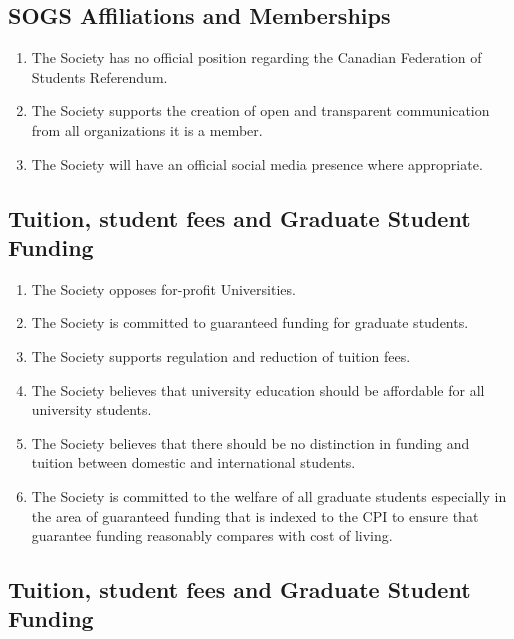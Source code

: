 \subsection{SOGS Affiliations and Memberships}
\begin{enumerate}
\item	The Society has no official position regarding the Canadian Federation of Students Referendum.
\item The Society supports the creation of open and transparent communication from all organizations it is a member.
\item The Society will have an official social media presence where appropriate.   
\end{enumerate}

\subsection{Tuition, student fees and Graduate Student Funding}
\begin{enumerate}
\item 	The Society opposes for-profit Universities. 
\item The Society is committed to guaranteed funding for graduate students.
\item 	The Society supports regulation and reduction of tuition fees.
\item The Society believes that university education should be affordable for all university students.
\item The Society believes that there should be no distinction in funding and tuition between domestic and international students.
\item The Society is committed to the welfare of all graduate students especially in the area of guaranteed funding that is indexed to the CPI to ensure that guarantee funding reasonably compares with cost of living.

\end{enumerate}


\subsection{Tuition, student fees and Graduate Student Funding}
